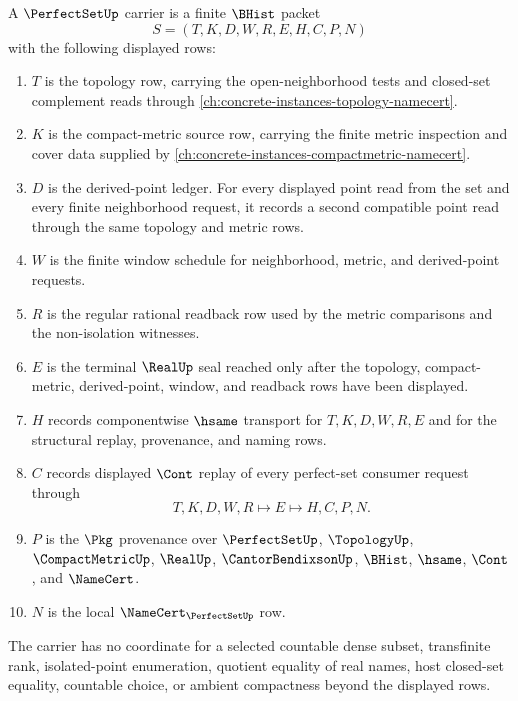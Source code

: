 \begin{definition}
\label{def:perfect-set-carrier}
A $\PerfectSetUp$ carrier is a finite $\BHist$ packet
$$
S=(T,K,D,W,R,E,H,C,P,N)
$$
with the following displayed rows:
\begin{enumerate}
\item $T$ is the topology row, carrying the open-neighborhood tests and closed-set complement reads through \autoref{ch:concrete-instances-topology-namecert}.
\item $K$ is the compact-metric source row, carrying the finite metric inspection and cover data supplied by \autoref{ch:concrete-instances-compactmetric-namecert}.
\item $D$ is the derived-point ledger. For every displayed point read from the set and every finite neighborhood request, it records a second compatible point read through the same topology and metric rows.
\item $W$ is the finite window schedule for neighborhood, metric, and derived-point requests.
\item $R$ is the regular rational readback row used by the metric comparisons and the non-isolation witnesses.
\item $E$ is the terminal $\RealUp$ seal reached only after the topology, compact-metric, derived-point, window, and readback rows have been displayed.
\item $H$ records componentwise $\hsame$ transport for $T,K,D,W,R,E$ and for the structural replay, provenance, and naming rows.
\item $C$ records displayed $\Cont$ replay of every perfect-set consumer request through
$$
T,K,D,W,R \longmapsto E \longmapsto H,C,P,N .
$$
\item $P$ is the $\Pkg$ provenance over $\PerfectSetUp$, $\TopologyUp$, $\CompactMetricUp$, $\RealUp$, $\CantorBendixsonUp$, $\BHist$, $\hsame$, $\Cont$, and $\NameCert$.
\item $N$ is the local $\NameCert_{\PerfectSetUp}$ row.
\end{enumerate}
The carrier has no coordinate for a selected countable dense subset, transfinite rank, isolated-point enumeration, quotient equality of real names, host closed-set equality, countable choice, or ambient compactness beyond the displayed rows.
\end{definition}

